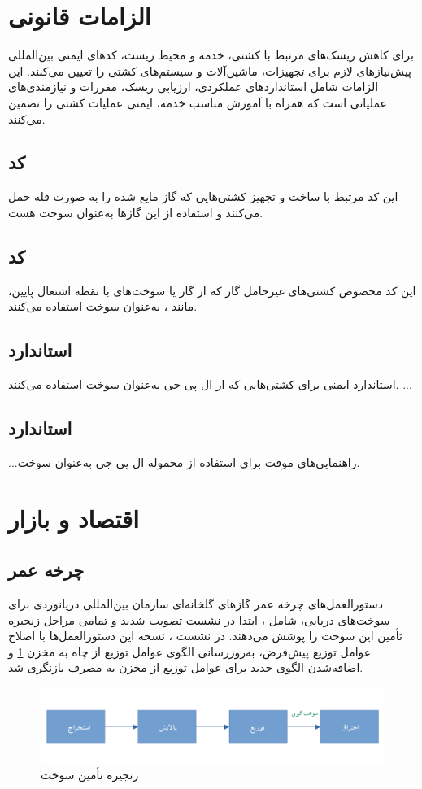 \section{الزامات قانونی}
برای کاهش ریسک‌های مرتبط با کشتی، خدمه و محیط زیست، کدهای ایمنی بین‌المللی پیش‌نیازهای لازم برای تجهیزات، ماشین‌آلات و سیستم‌های کشتی را تعیین می‌کنند. این الزامات شامل استانداردهای عملکردی، ارزیابی ریسک، مقررات و نیازمندی‌های عملیاتی است که همراه با آموزش مناسب خدمه، ایمنی عملیات کشتی را تضمین می‌کنند.
\subsection{کد }
این کد مرتبط با ساخت و تجهیز کشتی‌هایی که گاز مایع شده را به صورت فله حمل می‌کنند و استفاده از این گازها به‌عنوان سوخت هست.
\subsection{کد }
این کد مخصوص کشتی‌های غیرحامل گاز که از گاز یا سوخت‌های با نقطه اشتعال پایین، مانند
،
به‌عنوان سوخت استفاده می‌کنند.	

\subsection{استاندارد }
استاندارد ایمنی برای کشتی‌هایی که از ال پی جی به‌عنوان سوخت استفاده می‌کنند.
...
\subsection{استاندارد }
...راهنمایی‌های موقت برای استفاده از محموله ال پی جی به‌عنوان سوخت.


\section{اقتصاد و بازار }
\subsection{چرخه عمر}
دستورالعمل‌های چرخه عمر گازهای گلخانه‌ای 
 سازمان بین‌المللی دریانوردی  برای سوخت‌های دریایی، شامل 
 ، ابتدا در نشست 
 تصویب شدند و تمامی مراحل زنجیره تأمین این سوخت را پوشش می‌دهند. در نشست
  ،
   نسخه
    این دستورالعمل‌ها 
    با اصلاح عوامل توزیع پیش‌فرض، به‌روزرسانی الگوی عوامل توزیع از چاه به مخزن
    \cref{Suplly-Chain}
     و اضافه‌شدن الگوی جدید برای عوامل توزیع از مخزن به مصرف 
      بازنگری شد.
 \cite{Comparative-Life-Cycle}
 \begin{figure}[!h]
 	\centering
 	\includegraphics[width=15cm]{Figures/LPG/supply-chain.png}
 	\caption{ زنجیره تأمین سوخت}\label{Suplly-Chain}
 \end{figure}
 
